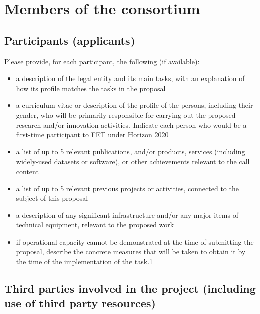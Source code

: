 \documentclass[12pt, a4paper]{article} %
\begin{document}
  \section{Members of the consortium}

 \subsection{Participants (applicants)}

 
 Please provide, for each participant, the following (if available):
 \begin{itemize}
 \item a description of the legal entity and its main tasks, with an
   explanation of how its profile matches the tasks in the proposal
 \item a curriculum vitae or description of the profile of the
   persons, including their gender, who will be primarily responsible
   for carrying out the proposed research and/or innovation
   activities. Indicate each person who would be a first-time
   participant to FET under Horizon 2020
 \item a list of up to 5 relevant publications, and/or products,
   services (including widely-used datasets or software), or other
   achievements relevant to the call content
 \item a list of up to 5 relevant previous projects or activities,
   connected to the subject of this proposal
 \item a description of any significant infrastructure and/or any
   major items of technical equipment, relevant to the proposed work
 \item if operational capacity cannot be demonstrated at the time of
   submitting the proposal, describe the concrete measures that will
   be taken to obtain it by the time of the implementation of the
   task.1
 \end{itemize}

 \subsection{Third parties involved in the project (including use of third party resources)}
\end{document}
